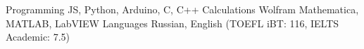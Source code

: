 \begin{cvskills}
	\cvskill
		{Programming}
		{JS, Python, Arduino, C, C++}
	\cvskill
		{Calculations}
		{Wolfram Mathematica, MATLAB, LabVIEW}
	\cvskill
		{Languages}
		{Russian, English (TOEFL iBT: 116, IELTS Academic: 7.5)}
\end{cvskills}